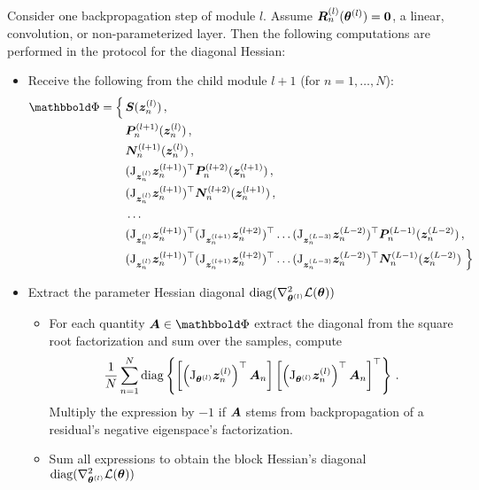 Consider one backpropagation step of module $l$. Assume
${\bm{R}}_n^{(l)}({\bm{\theta}}^{(l)}) = {\bm{0}}$, \ie a linear, convolution, or
non-parameterized layer. Then the following computations are performed in the
protocol for the diagonal Hessian:
\begin{itemize}
\item Receive the following from the child module $l+1$ (for
  $n=1,\dots, N$):
  \begin{align*}
    \begin{split}
      \sPhi =\Big\{\,
      & \mS(\vz^{(l)}_n)\equationPunctuation{,}
      \\
      &\mP_n^{(l+1)}(\vz_n^{(l)})\equationPunctuation{,}
      \\
      &\mN_n^{(l+1)}(\vz_n^{(l)})\equationPunctuation{,}
      \\
      &(\jac_{\vz_n^{(l)}} \vz_n^{(l+1)})^\top
        \mP_n^{(l+2)}(\vz_n^{(l+1)})\equationPunctuation{,}
      \\
      &(\jac_{\vz_n^{(l)}}
        \vz_n^{(l+1)})^\top\mN_n^{(l+2)}(\vz_n^{(l+1)})\equationPunctuation{,}
      \\
      & \dots
      \\
      &(\jac_{\vz_n^{(l)}} \vz_n^{(l+1)})^\top (\jac_{\vz_n^{(l+1)}}
        \vz_n^{(l+2)})^\top \dots (\jac_{\vz_n^{(L-3)}} \vz_n^{(L-2)})^\top
        \mP_n^{(L-1)}(\vz_n^{(L-2)})\equationPunctuation{,}
      \\
      &(\jac_{\vz_n^{(l)}} \vz_n^{(l+1)})^\top (\jac_{\vz_n^{(l+1)}}
        \vz_n^{(l+2)})^\top \dots (\jac_{\vz_n^{(L-3)}} \vz_n^{(L-2)})^\top
        \mN_n^{(L-1)}(\vz_n^{(L-2)})\ \Big\}
    \end{split}\label{backpack::equ:received_quantities_diagH}
  \end{align*}
\item Extract the parameter Hessian diagonal $\operatorname{diag} (
    \nabla_{{\bm{\theta}}^{(l)}}^2\mathcal{L}({\bm{\theta}}) )$
  \begin{itemize}
  \item For each quantity $\mA \in \sPhi$ extract the diagonal from the square
    root factorization and sum over the samples, \ie compute
    \begin{align*}
      \dfrac{1}{N}
      \sum_{n=1}^N
      \operatorname{diag} \left\{
      \left[
      \left(\mathrm{J}_{{\bm{\theta}}^{(l)}}{\bm{z}}_n^{(l)}\right)^\top{\bm{A}}_n
      \right]
      \left[
      \left(\mathrm{J}_{{\bm{\theta}}^{(l)}}{\bm{z}}_n^{(l)}\right)^\top{\bm{A}}_n
      \right]^\top
      \right\}\,{.}
    \end{align*}
    Multiply the expression by $-1$ if ${\bm{A}}$ stems from backpropagation of a
    residual's negative eigenspace's factorization.
  \item Sum all expressions to obtain the block Hessian's diagonal
    $\operatorname{diag} (\nabla_{{\bm{\theta}}^{(l)}}^2\mathcal{L}({\bm{\theta}}))$
  \end{itemize}


\end{itemize}
